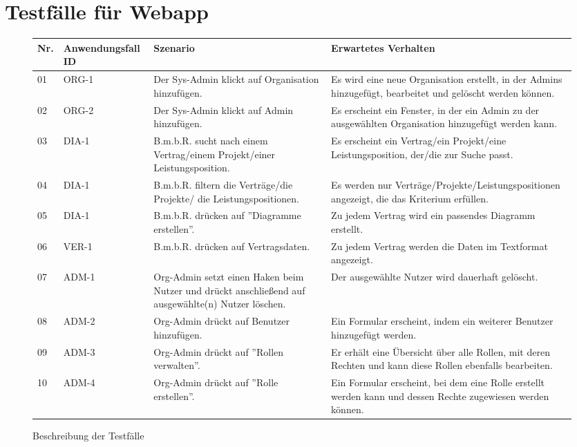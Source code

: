 \section{Testfälle für Webapp}
\begin{figure}[!h]
	\begin{center}
		\begin{tabularx}{\textwidth}{ p{} | p{} | p{} | X }
			\textbf{Nr.} & \textbf{Anwendungsfall ID} & \textbf{Szenario} & \textbf{Erwartetes Verhalten} \\ \hline
			01 & ORG-1 & Der Sys-Admin klickt auf Organisation hinzufügen. & Es wird eine neue Organisation erstellt, in der Admins hinzugefügt, bearbeitet und gelöscht werden können. \\ \hline
			02 & ORG-2 & Der Sys-Admin klickt auf Admin hinzufügen. & Es erscheint ein Fenster, in der ein Admin zu der ausgewählten Organisation hinzugefügt werden kann. \\ \hline
			03 & DIA-1 & B.m.b.R. sucht nach einem Vertrag/einem Projekt/einer Leistungsposition. & Es erscheint ein Vertrag/ein Projekt/eine Leistungsposition, der/die zur Suche passt. \\ \hline
			04 & DIA-1 & B.m.b.R. filtern die Verträge/die Projekte/ die Leistungspositionen. & Es werden nur Verträge/Projekte/Leistungspositionen angezeigt, die das Kriterium erfüllen. \\ \hline
			05 & DIA-1 & B.m.b.R. drücken auf ''Diagramme erstellen''. & Zu jedem Vertrag wird ein passendes Diagramm erstellt. \\ \hline
			06 & VER-1 & B.m.b.R. drücken auf Vertragsdaten. & Zu jedem Vertrag werden die Daten im Textformat angezeigt. \\ \hline 
			07 & ADM-1 & Org-Admin setzt einen Haken beim Nutzer und drückt anschließend auf ausgewählte(n) Nutzer löschen. & Der ausgewählte Nutzer wird dauerhaft gelöscht. \\ \hline
			08 & ADM-2 & Org-Admin drückt auf Benutzer hinzufügen. & Ein Formular erscheint, indem ein weiterer Benutzer hinzugefügt werden. \\ \hline
			09 & ADM-3 & Org-Admin drückt auf ''Rollen verwalten''. & Er erhält eine Übersicht über alle Rollen, mit deren Rechten und kann diese Rollen ebenfalls bearbeiten. \\ \hline
			10 & ADM-4 & Org-Admin drückt auf ''Rolle erstellen''. & Ein Formular erscheint, bei dem eine Rolle erstellt werden kann und dessen Rechte zugewiesen werden können. \\ \hline
		\end{tabularx}	
	\end{center}
	\caption{Beschreibung der Testfälle}
	\label{fig:testfaelle-web-app-tabelle}
\end{figure}


